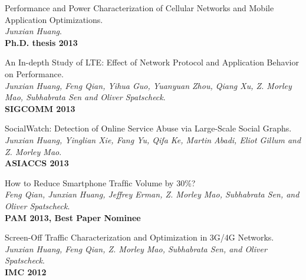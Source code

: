 \documentclass[letterpaper]{article}
\renewenvironment{itemize}{
  \begin{list}{}{
    \setlength{\leftmargin}{1em}
  }
}{
  \end{list}
}
\begin{document}
\begin{itemize}

\item {Performance and Power Characterization of Cellular Networks and Mobile Application Optimizations.\\
{\em Junxian Huang}.\\
{\bf Ph.D. thesis 2013}}



\item {An In-depth Study of LTE: Effect of Network Protocol and Application Behavior on Performance.\\
{\em Junxian Huang, Feng Qian, Yihua Guo, Yuanyuan Zhou, Qiang Xu, Z. Morley Mao, Subhabrata Sen and Oliver Spatscheck}.\\
{\bf SIGCOMM 2013}}

\item {SocialWatch: Detection of Online Service Abuse via Large-Scale Social Graphs.\\
{\em Junxian Huang, Yinglian Xie, Fang Yu, Qifa Ke, Martin Abadi, Eliot Gillum and Z. Morley Mao}.\\
{\bf ASIACCS 2013}}


\item {How to Reduce Smartphone Trafﬁc Volume by 30\%?\\
{\em Feng Qian, Junxian Huang, Jeffrey Erman, Z. Morley Mao, Subhabrata Sen, and Oliver Spatscheck}.\\
{\bf PAM 2013, Best Paper Nominee}}

\item {Screen-Off Traffic Characterization and Optimization in 3G/4G Networks.\\
{\em Junxian Huang, Feng Qian, Z. Morley Mao, Subhabrata Sen, and Oliver Spatscheck}.\\
{\bf IMC 2012}}



\end{itemize}
\end{document}
